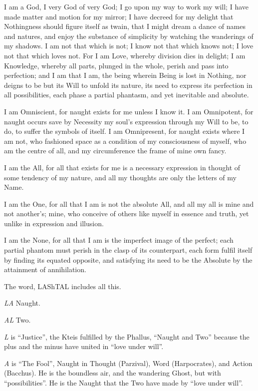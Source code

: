 I am a God, I very God of very God; I go upon my way to work my will; I have made matter and motion for my mirror; I have decreed for my delight that Nothingness should figure itself as twain, that I might dream a dance of names and natures, and enjoy the substance of simplicity by watching the wanderings of my shadows. I am not that which is not; I know not that which knows not; I love not that which loves not. For I am Love, whereby division dies in delight; I am Knowledge, whereby all parts, plunged in the whole, perish and pass into perfection; and I am that I am, the being wherein Being is lost in Nothing, nor deigns to be but its Will to unfold its nature, its need to express its perfection in all possibilities, each phase a partial phantasm, and yet inevitable and absolute.

I am Omniscient, for naught exists for me unless I know it. I am Omnipotent, for naught occurs save by Necessity my soul's expression through my Will to be, to do, to suffer the symbols of itself. I am Omnipresent, for naught exists where I am not, who fashioned space as a condition of my consciousness of myself, who am the centre of all, and my circumference the frame of mine own fancy.

I am the All, for all that exists for me is a necessary expression in thought of some tendency of my nature, and all my thoughts are only the letters of my Name.

I am the One, for all that I am is not the absolute All, and all my all is mine and not another's; mine, who conceive of others like myself in essence and truth, yet unlike in expression and illusion.

I am the None, for all that I am is the imperfect image of the perfect; each partial phantom must perish in the clasp of its counterpart, each form fulfil itself by finding its equated opposite, and satisfying its need to be the Absolute by the attainment of annihilation.

The word, LAShTAL includes all this.

\textit{LA} \textemdash{} Naught.

\textit{AL} \textemdash{} Two.

\textit{L} is \enquote{Justice}, the Kteis fulfilled by the Phallus, \enquote{Naught and Two} because the plus and the minus have united in \enquote{love under will}.

\textit{A} is \enquote{The Fool}, Naught in Thought (Parzival), Word (Harpocrates), and Action (Bacchus). He is the boundless air, and the wandering Ghost, but with \enquote{possibilities}. He is the Naught that the Two have made by \enquote{love under will}.

